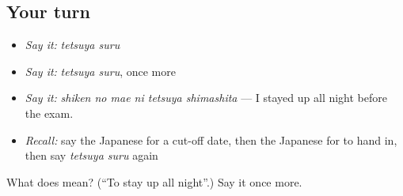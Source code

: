 \subsection*{Your turn}
\begin{itemize}
\raggedright
  \item \emph{Say it:} \emph{tetsuya suru}
  \item \emph{Say it:} \emph{tetsuya suru}, once more
  \item \emph{Say it:} \emph{shiken no mae ni tetsuya shimashita} — I stayed up all night before the exam.
  \item \emph{Recall:} say the Japanese for a cut-off date, then the Japanese for to hand in, then say \emph{tetsuya suru} again
\end{itemize}

\begin{tcolorbox}[breakable,colback=teal!4,colframe=teal!35!black,title={Before you move on}]
What does  mean? (\textquotedblleft{}To stay up all night\textquotedblright{}.) Say it once more.
\end{tcolorbox}
